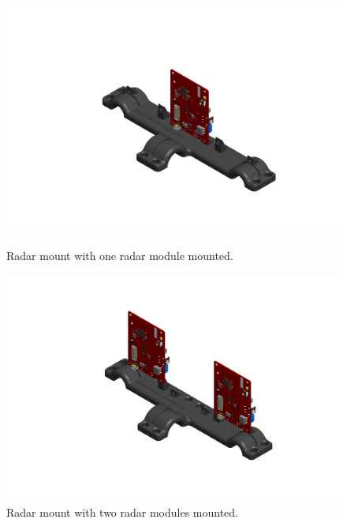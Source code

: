 \begin{figure}[H]
    \centering
    \begin{minipage}[b]{0.49\textwidth}
        \includegraphics[width=\textwidth]{Figures/CAD/uppermount1radar.PNG}
        \caption{Radar mount with one radar module mounted.}
        \label{fig:uppermount1radar}
    \end{minipage}
    \begin{minipage}[b]{0.49\textwidth}
        \includegraphics[width=\textwidth]{Figures/CAD/uppermount2radar.PNG}
        \caption{Radar mount with two radar modules mounted.}
        \label{fig:uppermount2radar}
    \end{minipage}
\end{figure}

